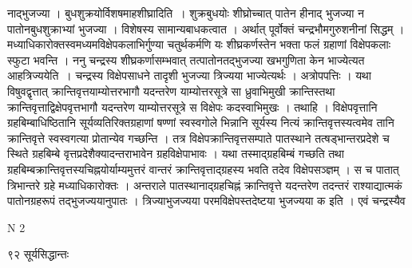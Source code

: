 \documentclass[11pt, openany]{book}
\begin{document}
\begin{sloppypar}
\noindent नाद्भुजज्या । बुधशुक्रयोर्विशषमाह\textendash शीघ्रादिति~। शुक्रबुधयोः शीघ्रोच्चात् पातेन हीनाद् भुजज्या न पातोनबुधशुक्राभ्यां भुजज्या । विशेषस्य सामान्यबाधकत्वात । अर्थात् पूर्वोक्तं चन्द्रभौमगुरुशनीनां सिद्धम् । मध्याधिकारोक्तस्वमध्यमविक्षेपकलाभिर्गुण्या चतुर्थकर्मणि यः शीघ्रकर्णस्तेन भक्ता फलं ग्रहाणां विक्षेपकलाः स्फुटा भवन्ति । ननु चन्द्रस्य शीघ्रकर्णासम्भवात् तत्पातोनतद्भुजज्या खभगुणिता केन भाज्येत्यत आह\textendash त्रिज्ययेति~। चन्द्रस्य विक्षेपसाधने तादृशी भुजज्या त्रिज्यया भाज्येत्यर्थः । अत्रोपपत्तिः । यथा विषुवद्वृत्तात् क्रान्तिवृत्तयाम्योत्तरभागौ यदन्तरेण याम्योत्तरसूत्रे सा ध्रुवाभिमुखी क्रान्तिस्तथा क्रान्तिवृत्ताद्विक्षेपवृत्तभागौ यदन्तरेण याम्योत्तरसूत्रे स विक्षेपः कदस्वाभिमुखः । तथाहि । विक्षेपवृत्तानि ग्रहबिम्बाधिष्ठितानि सूर्यव्यतिरिक्तग्रहाणां षण्णां स्वस्वगोले भिन्नानि सूर्यस्य नित्यं क्रान्तिवृत्तस्यत्वमेव तानि क्रान्तिवृत्ते स्वस्वगत्या प्रोतान्येव गच्छन्ति । तत्र विक्षेपक्रान्तिवृत्तसम्पाते पातस्थाने तत्षड्भान्तरप्रदेशे च स्थिते ग्रहबिम्बे वृत्तप्रदेशैक्यादन्तराभावेन ग्रहविक्षेपाभावः । यथा तस्माद्ग्रहबिम्बं गच्छति तथा ग्रहबिम्बक्रान्तिवृत्तस्यचिह्नयोर्याम्यमुत्तरं वान्तरं क्रान्तिवृत्ताद्ग्रहस्य भवति तदेव विक्षेपसञ्ज्ञम् । स च पातात् त्रिभान्तरे ग्रहे मध्याधिकारोक्तः । अन्तराले पातस्थानाद्ग्रहचिह्नं क्रान्तिवृत्ते यदन्तरेण तदन्तरं राश्याद्यात्मकं पातोनग्रहरूपं तद्भुजज्ययानुपातः । त्रिज्याभुजज्यया परमविक्षेपस्तदेष्टया भुजज्यया क इति । एवं चन्द्रस्यैव
\end{sloppypar}

{\tiny{N 2}}
\newpage

\noindent ९२ \hspace{4cm} सूर्यसिद्धान्तः
\vspace{1cm}
\end{document}
